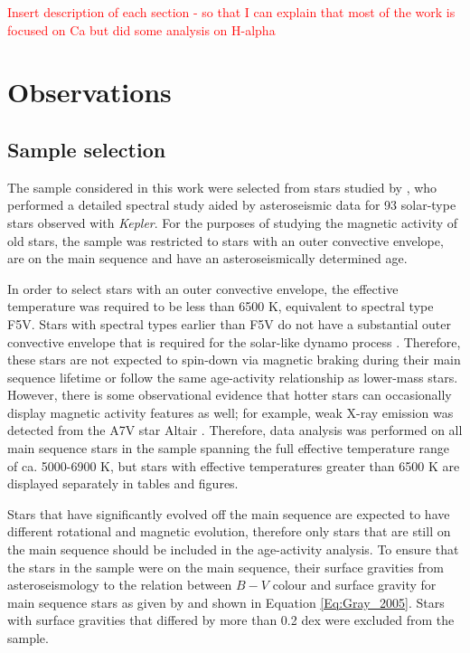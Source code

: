 \textcolor{red}{Insert description of each section - so that I can explain that most of the work is focused on Ca but did some analysis on H-alpha}

\section{Observations}
\subsection{Sample selection}
\label{Chp4_obs_sample_selection}
The sample considered in this work were selected from stars studied by \citet{Bruntt_etal_2012}, who performed a detailed spectral study aided by asteroseismic data for 93 solar-type stars observed with \textit{Kepler}. For the purposes of studying the magnetic activity of old stars, the sample was restricted to stars with an outer convective envelope, are on the main sequence and have an asteroseismically determined age.

In order to select stars with an outer convective envelope, the effective temperature was required to be less than 6500 K, equivalent to spectral type F5V. Stars with spectral types earlier than F5V do not have a substantial outer convective envelope that is required for the solar-like dynamo process \citep{Pinsonneault_etal_2001}. Therefore, these stars are not expected to spin-down via magnetic braking during their main sequence lifetime or follow the same age-activity relationship as lower-mass stars. However, there is some observational evidence that hotter stars can occasionally display magnetic activity features as well; for example, weak X-ray emission was detected from the A7V star Altair \citep{Robrade_Schmitt_2009}. Therefore, data analysis was performed on all main sequence stars in the sample spanning the full effective temperature range of ca. 5000-6900 K, but stars with effective temperatures greater than 6500 K are displayed separately in tables and figures.

Stars that have significantly evolved off the main sequence are expected to have different rotational and magnetic evolution, therefore only stars that are still on the main sequence should be included in the age-activity analysis. To ensure that the stars in the sample were on the main sequence, their surface gravities \citep{Bruntt_etal_2012} from asteroseismology to the relation between $B-V$ colour and surface gravity for main sequence stars as given by \citet{Gray_2005} and shown in Equation \ref{Eq:Gray_2005}. Stars with surface gravities that differed by more than 0.2 dex were excluded from the sample.

